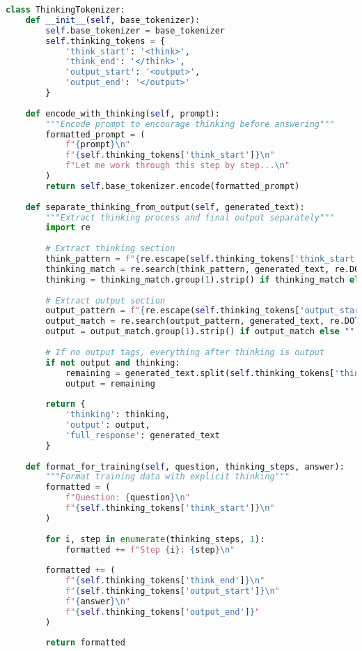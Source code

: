\begin{lstlisting}[language=Python, caption=Basic thinking token implementation]
class ThinkingTokenizer:
    def __init__(self, base_tokenizer):
        self.base_tokenizer = base_tokenizer
        self.thinking_tokens = {
            'think_start': '<think>',
            'think_end': '</think>',
            'output_start': '<output>',
            'output_end': '</output>'
        }
        
    def encode_with_thinking(self, prompt):
        """Encode prompt to encourage thinking before answering"""
        formatted_prompt = (
            f"{prompt}\n"
            f"{self.thinking_tokens['think_start']}\n"
            f"Let me work through this step by step...\n"
        )
        return self.base_tokenizer.encode(formatted_prompt)
    
    def separate_thinking_from_output(self, generated_text):
        """Extract thinking process and final output separately"""
        import re
        
        # Extract thinking section
        think_pattern = f"{re.escape(self.thinking_tokens['think_start'])}(.*?){re.escape(self.thinking_tokens['think_end'])}"
        thinking_match = re.search(think_pattern, generated_text, re.DOTALL)
        thinking = thinking_match.group(1).strip() if thinking_match else ""
        
        # Extract output section
        output_pattern = f"{re.escape(self.thinking_tokens['output_start'])}(.*?){re.escape(self.thinking_tokens['output_end'])}"
        output_match = re.search(output_pattern, generated_text, re.DOTALL)
        output = output_match.group(1).strip() if output_match else ""
        
        # If no output tags, everything after thinking is output
        if not output and thinking:
            remaining = generated_text.split(self.thinking_tokens['think_end'])[-1].strip()
            output = remaining
        
        return {
            'thinking': thinking,
            'output': output,
            'full_response': generated_text
        }
    
    def format_for_training(self, question, thinking_steps, answer):
        """Format training data with explicit thinking"""
        formatted = (
            f"Question: {question}\n"
            f"{self.thinking_tokens['think_start']}\n"
        )
        
        for i, step in enumerate(thinking_steps, 1):
            formatted += f"Step {i}: {step}\n"
        
        formatted += (
            f"{self.thinking_tokens['think_end']}\n"
            f"{self.thinking_tokens['output_start']}\n"
            f"{answer}\n"
            f"{self.thinking_tokens['output_end']}"
        )
        
        return formatted
\end{lstlisting}

